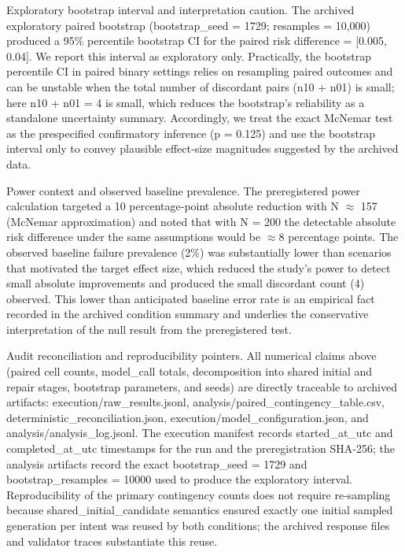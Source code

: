 \documentclass[conference]{IEEEtran}
\begin{document}
Exploratory bootstrap interval and interpretation caution. The archived exploratory paired bootstrap (bootstrap\_seed = 1729; resamples = 10,000) produced a 95\% percentile bootstrap CI for the paired risk difference = [0.005, 0.04]. We report this interval as exploratory only. Practically, the bootstrap percentile CI in paired binary settings relies on resampling paired outcomes and can be unstable when the total number of discordant pairs (n10 + n01) is small; here n10 + n01 = 4 is small, which reduces the bootstrap's reliability as a standalone uncertainty summary. Accordingly, we treat the exact McNemar test as the prespecified confirmatory inference (p = 0.125) and use the bootstrap interval only to convey plausible effect‑size magnitudes suggested by the archived data.

Power context and observed baseline prevalence. The preregistered power calculation targeted a 10 percentage‑point absolute reduction with N \ensuremath{\approx} 157 (McNemar approximation) and noted that with N = 200 the detectable absolute risk difference under the same assumptions would be \ensuremath{\approx}8 percentage points. The observed baseline failure prevalence (2\%) was substantially lower than scenarios that motivated the target effect size, which reduced the study's power to detect small absolute improvements and produced the small discordant count (4) observed. This lower than anticipated baseline error rate is an empirical fact recorded in the archived condition summary and underlies the conservative interpretation of the null result from the preregistered test.

Audit reconciliation and reproducibility pointers. All numerical claims above (paired cell counts, model\_call totals, decomposition into shared initial and repair stages, bootstrap parameters, and seeds) are directly traceable to archived artifacts: execution/raw\_results.jsonl, analysis/paired\_contingency\_table.csv, deterministic\_reconciliation.json, execution/model\_configuration.json, and analysis/analysis\_log.jsonl. The execution manifest records started\_at\_utc and completed\_at\_utc timestamps for the run and the preregistration SHA‑256; the analysis artifacts record the exact bootstrap\_seed = 1729 and bootstrap\_resamples = 10000 used to produce the exploratory interval. Reproducibility of the primary contingency counts does not require re‑sampling because shared\_initial\_candidate semantics ensured exactly one initial sampled generation per intent was reused by both conditions; the archived response files and validator traces substantiate this reuse.
\end{document}
